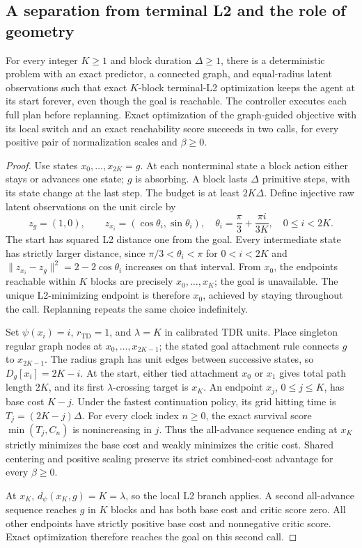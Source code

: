 \documentclass{article} %
\newcommand{\Htd}{r_{\mathrm{TD}}}
\newcommand{\dd}{d_{\psi}}
\theoremstyle{definition}
\theoremstyle{remark}
\begin{document}
\subsection{A separation from terminal L2 and the role of geometry}
\label{app:separation}
\begin{proposition}
\label{prop:l2-separation}
For every integer $K\ge1$ and block duration $\Delta\ge1$, there is a deterministic
problem with an exact predictor, a connected graph, and equal-radius latent observations
such that exact $K$-block terminal-L2 optimization keeps the agent at its start forever,
even though the goal is reachable. The controller executes each full plan before replanning.
Exact optimization of the graph-guided objective with
its local switch and an exact reachability score succeeds in two calls, for every
positive pair of normalization scales and $\beta\ge0$.
\end{proposition}
\begin{proof}
Use states $x_0,\ldots,x_{2K}=g$. At each nonterminal state a block action either
stays or advances one state; $g$ is absorbing. A block lasts $\Delta$ primitive
steps, with its state change at the last step. The budget is at least $2K\Delta$.
Define injective raw latent observations on the unit circle by
\[
 z_g=(1,0),\qquad
 z_{x_i}=(\cos\theta_i,\sin\theta_i),\quad
 \theta_i=\frac\pi3+\frac{\pi i}{3K},\quad 0\le i<2K.
\]
The start has squared L2 distance one from the goal. Every intermediate state has strictly
larger distance, since $\pi/3<\theta_i<\pi$ for $0<i<2K$ and
$\|z_{x_i}-z_g\|^2=2-2\cos\theta_i$ increases on that interval.
From $x_0$, the endpoints reachable within $K$ blocks are precisely
$x_0,\ldots,x_K$; the goal is unavailable. The unique L2-minimizing endpoint is
therefore $x_0$, achieved by staying throughout the call. Replanning repeats the
same choice indefinitely.

Set $\psi(x_i)=i$, $\Htd=1$, and $\lambda=K$ in calibrated TDR units.
Place singleton regular graph nodes at $x_0,\ldots,x_{2K-1}$; the stated goal
attachment rule connects $g$ to $x_{2K-1}$. The radius graph has unit edges between
successive states, so $D_g[x_i]=2K-i$. At the start, either tied attachment $x_0$
or $x_1$ gives total path length $2K$, and its first $\lambda$-crossing target is
$x_K$. An endpoint $x_j$, $0\le j\le K$, has base cost $K-j$.
Under the fastest continuation policy, its grid hitting time is
$T_j=(2K-j)\Delta$. For every clock index $n\ge0$, the exact survival score
$\min(T_j,C_n)$ is nonincreasing in $j$.
Thus the all-advance sequence ending at $x_K$ strictly minimizes the base cost
and weakly minimizes the critic cost. Shared centering and positive scaling preserve
its strict combined-cost advantage for every $\beta\ge0$.

At $x_K$, $\dd(x_K,g)=K=\lambda$, so the local L2 branch applies. A second
all-advance sequence reaches $g$ in $K$ blocks and has both base cost and critic
score zero. All other endpoints have strictly positive base cost and nonnegative
critic score. Exact optimization therefore reaches the goal on this second call.
\end{proof}
\end{document}
